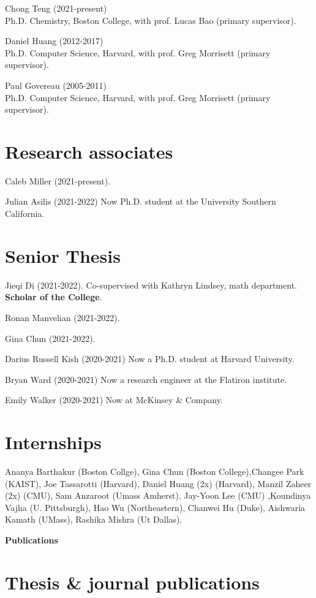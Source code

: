 \documentclass[margin,line]{res}
\begin{document}
\begin{resume}
Chong Teng (2021-present)\\
Ph.D. Chemistry, Boston College, with prof. Lucas Bao (primary supervisor).

Daniel Huang (2012-2017)\\
Ph.D. Computer Science, Harvard, with prof. Greg Morrisett (primary supervisor). 

Paul Govereau (2005-2011)\\
Ph.D. Computer Science, Harvard, with prof. Greg Morrisett (primary supervisor). 

\section{\sc Research associates}

Caleb Miller (2021-present).

Julian Asilis (2021-2022) \hfill Now Ph.D. student at the University Southern California.

\section{\sc Senior Thesis}

Jieqi Di (2021-2022). Co-supervised with Kathryn Lindsey, math department. {\bf Scholar of the College}.

Ronan Manvelian (2021-2022).

Gina Chun (2021-2022).

Darius Russell Kish (2020-2021) \hfill Now a Ph.D. student at Harvard University.

Bryan Ward (2020-2021) \hfill Now a research engineer at the Flatiron institute.

Emily Walker (2020-2021) \hfill Now at McKinsey \& Company.

\section{\sc Internships}

Ananya Barthakur (Boston Collge), Gina Chun (Boston College),Changee
Park (KAIST), Joe Tassarotti (Harvard), Daniel Huang (2x) (Harvard),
Manzil Zaheer (2x) (CMU), Sam Anzaroot (Umass Amherst), Jay-Yoon Lee
(CMU) ,Koundinya Vajha (U. Pittsburgh), Hao Wu (Northeastern), Chanwei
Hu (Duke), Aishwaria Kamath (UMass), Rashika Mishra (Ut Dallas).

\newpage
  {\bf {\Large Publications}}

\section{\sc Thesis \& journal publications}


\end{resume}
\end{document}
